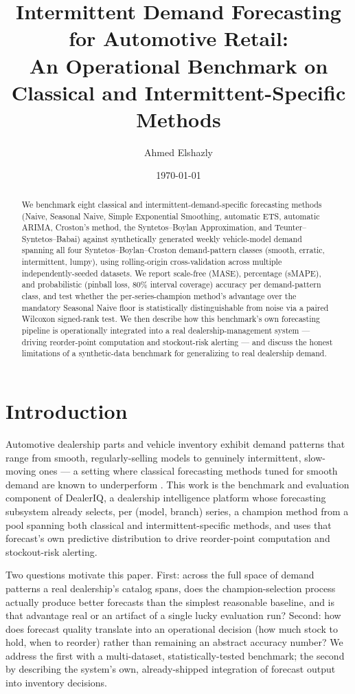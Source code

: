 \documentclass[11pt]{article}
\title{Intermittent Demand Forecasting for Automotive Retail:\\
An Operational Benchmark on Classical and Intermittent-Specific Methods}
\author{Ahmed Elshazly}
\date{\today}
\begin{document}
\maketitle

\begin{abstract}
We benchmark eight classical and intermittent-demand-specific forecasting methods
(Naive, Seasonal Naive, Simple Exponential Smoothing, automatic ETS, automatic ARIMA,
Croston's method, the Syntetos--Boylan Approximation, and Teunter--Syntetos--Babai)
against synthetically generated weekly vehicle-model demand spanning all four
Syntetos--Boylan--Croston demand-pattern classes (smooth, erratic, intermittent, lumpy),
using rolling-origin cross-validation across multiple independently-seeded datasets. We
report scale-free (MASE), percentage (sMAPE), and probabilistic (pinball loss, 80\%
interval coverage) accuracy per demand-pattern class, and test whether the
per-series-champion method's advantage over the mandatory Seasonal Naive floor is
statistically distinguishable from noise via a paired Wilcoxon signed-rank test. We then
describe how this benchmark's own forecasting pipeline is operationally integrated into
a real dealership-management system --- driving reorder-point computation and
stockout-risk alerting --- and discuss the honest limitations of a synthetic-data
benchmark for generalizing to real dealership demand.
\end{abstract}

\section{Introduction}

Automotive dealership parts and vehicle inventory exhibit demand patterns that range from
smooth, regularly-selling models to genuinely intermittent, slow-moving ones --- a
setting where classical forecasting methods tuned for smooth demand are known to
underperform \citep{croston1972forecasting, syntetos2005accuracy}. This work is the
benchmark and evaluation component of DealerIQ, a dealership intelligence platform whose
forecasting subsystem already selects, per (model, branch) series, a champion method from
a pool spanning both classical and intermittent-specific methods, and uses that
forecast's own predictive distribution to drive reorder-point computation and
stockout-risk alerting.

Two questions motivate this paper. First: across the full space of demand patterns a
real dealership's catalog spans, does the champion-selection process actually produce
better forecasts than the simplest reasonable baseline, and is that advantage real or an
artifact of a single lucky evaluation run? Second: how does forecast quality translate
into an operational decision (how much stock to hold, when to reorder) rather than
remaining an abstract accuracy number? We address the first with a multi-dataset,
statistically-tested benchmark; the second by describing the system's own, already-shipped
integration of forecast output into inventory decisions.
\end{document}
